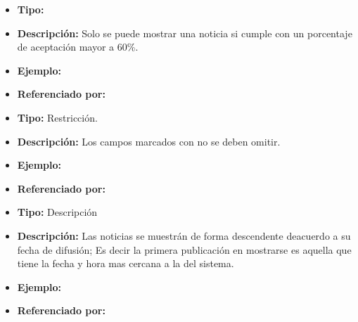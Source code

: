 \begin{itemize}
  \item \textbf{Tipo:}  
  \item \textbf{Descripción:} Solo se puede mostrar una noticia si cumple con un porcentaje de aceptación mayor a 60\%.
  \item \textbf{Ejemplo:}
  \item \textbf{Referenciado por:}  \\
\end{itemize}



\begin{itemize}
  \item \textbf{Tipo:} Restricción.  
  \item \textbf{Descripción:} Los campos marcados con \* no se deben omitir.
  \item \textbf{Ejemplo:} 
  \item \textbf{Referenciado por:}  \\
\end{itemize}


\begin{itemize}
  \item \textbf{Tipo:} Descripción
  \item \textbf{Descripción:} Las noticias se muestrán de forma descendente deacuerdo a su fecha de difusión; Es decir la primera publicación en mostrarse es aquella que tiene la fecha y hora mas cercana a la del sistema.
  \item \textbf{Ejemplo:} 
  \item \textbf{Referenciado por:}  \\
\end{itemize}


